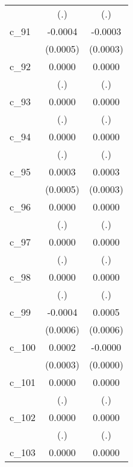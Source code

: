 {\begin{tabular}{l*{2}{c}}
            &         (.)        &         (.)        \\
[1em]
c\_91        &     -0.0004        &     -0.0003        \\
            &    (0.0005)        &    (0.0003)        \\
[1em]
c\_92        &      0.0000        &      0.0000        \\
            &         (.)        &         (.)        \\
[1em]
c\_93        &      0.0000        &      0.0000        \\
            &         (.)        &         (.)        \\
[1em]
c\_94        &      0.0000        &      0.0000        \\
            &         (.)        &         (.)        \\
[1em]
c\_95        &      0.0003        &      0.0003        \\
            &    (0.0005)        &    (0.0003)        \\
[1em]
c\_96        &      0.0000        &      0.0000        \\
            &         (.)        &         (.)        \\
[1em]
c\_97        &      0.0000        &      0.0000        \\
            &         (.)        &         (.)        \\
[1em]
c\_98        &      0.0000        &      0.0000        \\
            &         (.)        &         (.)        \\
[1em]
c\_99        &     -0.0004        &      0.0005        \\
            &    (0.0006)        &    (0.0006)        \\
[1em]
c\_100       &      0.0002        &     -0.0000        \\
            &    (0.0003)        &    (0.0000)        \\
[1em]
c\_101       &      0.0000        &      0.0000        \\
            &         (.)        &         (.)        \\
[1em]
c\_102       &      0.0000        &      0.0000        \\
            &         (.)        &         (.)        \\
[1em]
c\_103       &      0.0000        &      0.0000        \\

\end{tabular}}
